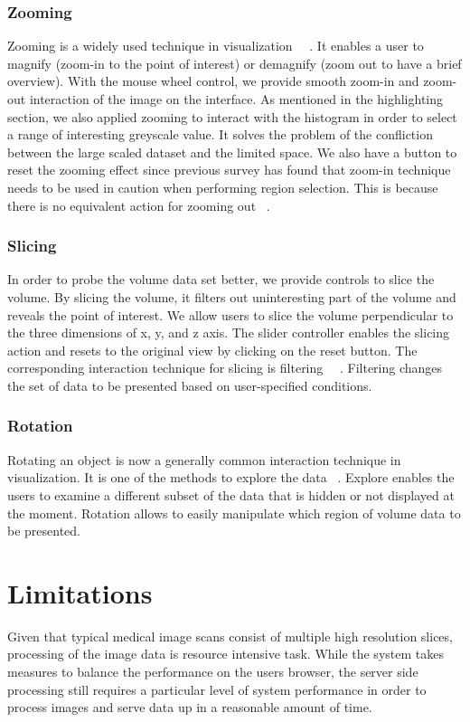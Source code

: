 \documentclass[annual]{acmsiggraph}
\begin{document}
\subsubsection{Zooming}
Zooming is a widely used technique in visualization ~\cite{shneiderman:1996}~\cite{cockburn:2008}. It enables a user to magnify (zoom-in to the point of interest) or demagnify (zoom out to have a brief overview). With the mouse wheel control, we provide smooth zoom-in and zoom-out interaction of the image on the interface. As mentioned in the highlighting section, we also applied zooming to interact with the histogram in order to select a range of interesting greyscale value. It solves the problem of the confliction between the large scaled dataset and the limited space. We also have a button to reset the zooming effect since previous survey has found that zoom-in technique needs to be used in caution when performing region selection. This is because there is no equivalent action for zooming out ~\cite{cockburn:2008}.

\subsubsection{Slicing}
In order to probe the volume data set better, we provide controls to slice the volume. By slicing the volume, it filters out uninteresting part of the volume and reveals the point of interest. We allow users to slice the volume perpendicular to the three dimensions of x, y, and z axis. The slider controller enables the slicing action and resets to the original view by clicking on the reset button. The corresponding interaction technique for slicing is filtering ~\cite{shneiderman:1996}~\cite{yi:2007}. Filtering changes the set of data to be presented based on user-specified conditions. 

\subsubsection{Rotation}
Rotating an object is now a generally common interaction technique in visualization. It is one of the methods to explore the data ~\cite{yi:2007}. Explore enables the users to examine a different subset of the data that is hidden or not displayed at the moment. Rotation allows to easily manipulate which region of volume data to be presented.

\section{Limitations}
Given that typical medical image scans consist of multiple high resolution slices, processing of the image data is resource intensive task.  While the system takes measures to balance the performance on the users browser, the server side processing still requires a particular level of system performance in order to process images and serve data up in a reasonable amount of time.
\end{document}
